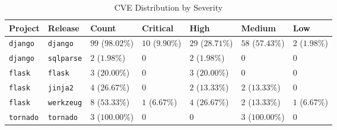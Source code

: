 \begin{table}
\caption{CVE Distribution by Severity}
\label{tab:cve-distribution}
\begin{tabular}{lllllll}
\toprule
Project & Release & Count & Critical & High & Medium & Low \\
\midrule
\texttt{django} & \texttt{django} & $99$ ($98.02\%$) & $10$ ($9.90\%$) & $29$ ($28.71\%$) & $58$ ($57.43\%$) & $2$ ($1.98\%$) \\
\texttt{django} & \texttt{sqlparse} & $2$ ($1.98\%$) & $0$ & $2$ ($1.98\%$) & $0$ & $0$ \\
\texttt{flask} & \texttt{flask} & $3$ ($20.00\%$) & $0$ & $3$ ($20.00\%$) & $0$ & $0$ \\
\texttt{flask} & \texttt{jinja2} & $4$ ($26.67\%$) & $0$ & $2$ ($13.33\%$) & $2$ ($13.33\%$) & $0$ \\
\texttt{flask} & \texttt{werkzeug} & $8$ ($53.33\%$) & $1$ ($6.67\%$) & $4$ ($26.67\%$) & $2$ ($13.33\%$) & $1$ ($6.67\%$) \\
\texttt{tornado} & \texttt{tornado} & $3$ ($100.00\%$) & $0$ & $0$ & $3$ ($100.00\%$) & $0$ \\
\bottomrule
\end{tabular}
\end{table}
